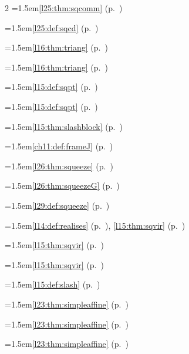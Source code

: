 \begin{multicols}{2}
\hangindent=1.5em\quad \ref{l25:thm:sqcomm} (p.~\pageref{l25:thm:sqcomm})\par
\hangindent=1.5em\quad \ref{l25:def:sqcd} (p.~\pageref{l25:def:sqcd})\par
\hangindent=1.5em\quad \ref{l16:thm:triang} (p.~\pageref{l16:thm:triang})\par
\hangindent=1.5em\quad \ref{l16:thm:triang} (p.~\pageref{l16:thm:triang})\par
\hangindent=1.5em\quad \ref{l15:def:sqpt} (p.~\pageref{l15:def:sqpt})\par
\hangindent=1.5em\quad \ref{l15:def:sqpt} (p.~\pageref{l15:def:sqpt})\par
\hangindent=1.5em\quad \ref{l15:thm:slashblock} (p.~\pageref{l15:thm:slashblock})\par
\hangindent=1.5em\quad \ref{ch11:def:frameJ} (p.~\pageref{ch11:def:frameJ})\par
\hangindent=1.5em\quad \ref{l26:thm:squeeze} (p.~\pageref{l26:thm:squeeze})\par
\hangindent=1.5em\quad \ref{l26:thm:squeezeG} (p.~\pageref{l26:thm:squeezeG})\par
\hangindent=1.5em\quad \ref{l29:def:squeeze} (p.~\pageref{l29:def:squeeze})\par
\hangindent=1.5em\quad \ref{l14:def:realises} (p.~\pageref{l14:def:realises}), \ref{l15:thm:sqvir} (p.~\pageref{l15:thm:sqvir})\par
\hangindent=1.5em\quad \ref{l15:thm:sqvir} (p.~\pageref{l15:thm:sqvir})\par
\hangindent=1.5em\quad \ref{l15:thm:sqvir} (p.~\pageref{l15:thm:sqvir})\par
\hangindent=1.5em\quad \ref{l15:def:slash} (p.~\pageref{l15:def:slash})\par
\hangindent=1.5em\quad \ref{l23:thm:simpleaffine} (p.~\pageref{l23:thm:simpleaffine})\par
\hangindent=1.5em\quad \ref{l23:thm:simpleaffine} (p.~\pageref{l23:thm:simpleaffine})\par
\hangindent=1.5em\quad \ref{l23:thm:simpleaffine} (p.~\pageref{l23:thm:simpleaffine})\par

\end{multicols}
